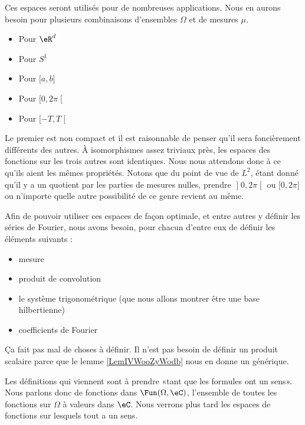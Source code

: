\begin{normaltext}
	Ces espaces seront utilisés pour de nombreuses applications. Nous en aurons besoin pour plusieurs combinaisons d'ensembles \( \Omega\) et de mesures \( \mu\).
	\begin{itemize}
		\item Pour \( \eR^d\)
		\item Pour \( S^1\)
		\item Pour \( \mathopen[ a , b \mathclose]\)
		\item Pour \( \mathopen[ 0 , 2\pi \mathclose[\)
		\item Pour \( \mathopen[ -T , T \mathclose[\)
	\end{itemize}
	Le premier est non compact et il est raisonnable de penser qu'il sera foncièrement différents des autres. À isomorphismes assez triviaux près, les espaces des fonctions sur les trois autres sont identiques. Nous nous attendons donc à ce qu'ils aient les mêmes propriétés. Notons que du point de vue de \( L^2\), étant donné qu'il y a un quotient par les parties de mesures nulles, prendre \( \mathopen] 0 , 2\pi \mathclose[\) ou \( \mathopen[ 0 , 2\pi \mathclose]\) ou n'importe quelle autre possibilité de ce genre revient au même.

	Afin de pouvoir utiliser ces espaces de façon optimale, et entre autres y définir les séries de Fourier, nous avons besoin, pour chacun d'entre eux de définir les éléments suivants :
	\begin{itemize}
		\item mesure
		\item produit de convolution
		\item le système trigonométrique (que nous allons montrer être une base hilbertienne)
		\item coefficients de Fourier
	\end{itemize}
	Ça fait pas mal de choses à définir. Il n'est pas besoin de définir un produit scalaire parce que le lemme \ref{LemIVWooZyWodb} nous en donne un générique.

	Les définitions qui viennent sont à prendre «tant que les formules ont un sens». Nous parlons donc de fonctions dans \( \Fun(\Omega,\eC)\), l'ensemble de toutes les fonctions sur \( \Omega\) à valeurs dans \( \eC\). Nous verrons plus tard les espaces de fonctions sur lesquels tout a un sens.
\end{normaltext}

